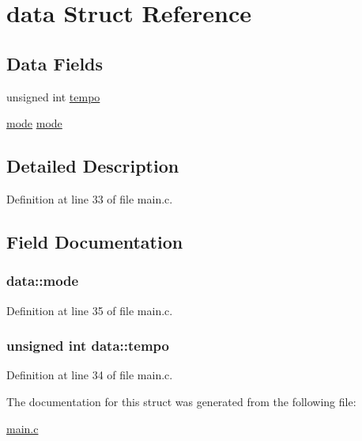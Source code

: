 \hypertarget{structdata}{\section{data Struct Reference}
\label{structdata}
}
\subsection*{Data Fields}
\begin{DoxyCompactItemize}
\item 
unsigned int \hyperlink{structdata_a31232da79683035a6ff185f530da6c24}{tempo}
\item 
\hyperlink{main_8c_a1a6b6fb557d8d37d59700faf4e4c9167}{mode} \hyperlink{structdata_a9781fc7b786289e4c06b4085d31558e3}{mode}
\end{DoxyCompactItemize}


\subsection{Detailed Description}


Definition at line 33 of file main.\+c.



\subsection{Field Documentation}
\hypertarget{structdata_a9781fc7b786289e4c06b4085d31558e3}{
\subsubsection[{mode}]{ data\+::mode}}\label{structdata_a9781fc7b786289e4c06b4085d31558e3}


Definition at line 35 of file main.\+c.

\hypertarget{structdata_a31232da79683035a6ff185f530da6c24}{
\subsubsection[{tempo}]{\setlength{\rightskip}{0pt plus 5cm}unsigned int data\+::tempo}}\label{structdata_a31232da79683035a6ff185f530da6c24}


Definition at line 34 of file main.\+c.



The documentation for this struct was generated from the following file\+:\begin{DoxyCompactItemize}
\item 
\hyperlink{main_8c}{main.\+c}\end{DoxyCompactItemize}
